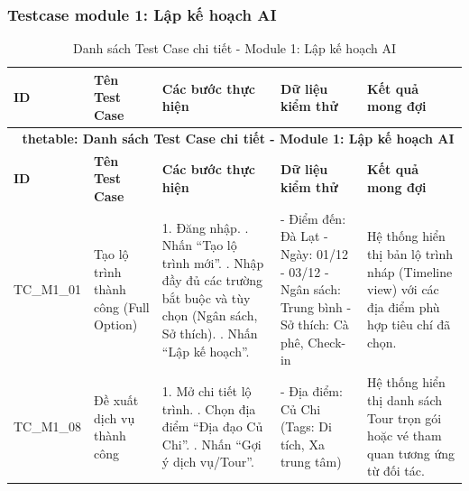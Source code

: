 \subsubsection{Testcase module 1: Lập kế hoạch AI}

\hypertarget{target:tc_m1}{}
\begin{landscape}
\small 
\begin{longtable}{|p{2.5cm}|p{4.0cm}|p{6.5cm}|p{4.5cm}|p{4.5cm}|}
    
\caption{Danh sách Test Case chi tiết - Module 1: Lập kế hoạch AI} \label{tab:tc_module1} \\
\hline
\textbf{ID} & \textbf{Tên Test Case} & \textbf{Các bước thực hiện} & \textbf{Dữ liệu kiểm thử} & \textbf{Kết quả mong đợi} \\
\hline
\endfirsthead

\multicolumn{5}{c}{{\bfseries \tablename\ thetable{}: Danh sách Test Case chi tiết - Module 1: Lập kế hoạch AI}} \\
\hline
\textbf{ID} & \textbf{Tên Test Case} & \textbf{Các bước thực hiện} & \textbf{Dữ liệu kiểm thử} & \textbf{Kết quả mong đợi} \\
\hline
\endhead

\hline
\endlastfoot


TC\_M1\_01 & Tạo lộ trình thành công (Full Option) & 
1. Đăng nhập. \newline 
2. Nhấn ``Tạo lộ trình mới''. \newline 
3. Nhập đầy đủ các trường bắt buộc và tùy chọn (Ngân sách, Sở thích). \newline 
4. Nhấn ``Lập kế hoạch''. & 
- Điểm đến: Đà Lạt \newline 
- Ngày: 01/12 - 03/12 \newline 
- Ngân sách: Trung bình \newline 
- Sở thích: Cà phê, Check-in & 
Hệ thống hiển thị bản lộ trình nháp (Timeline view) với các địa điểm phù hợp tiêu chí đã chọn. \\
\hline

TC\_M1\_08 & Đề xuất dịch vụ thành công & 
1. Mở chi tiết lộ trình. \newline 
2. Chọn địa điểm ``Địa đạo Củ Chi''. \newline 
3. Nhấn ``Gợi ý dịch vụ/Tour''. & 
- Địa điểm: Củ Chi (Tags: Di tích, Xa trung tâm) & 
Hệ thống hiển thị danh sách Tour trọn gói hoặc vé tham quan tương ứng từ đối tác. \\
\hline


\end{longtable}
\end{landscape}
